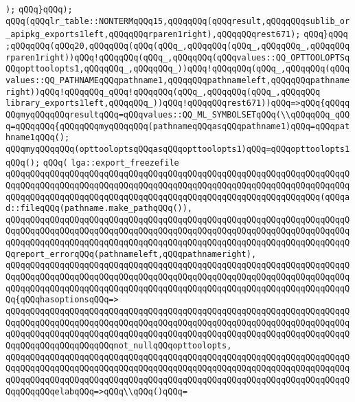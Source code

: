 \verb|);|\newline
\verb|qQQq}qQQq);|\newline
\verb|qQQq(qQQqlr_table::NONTERMqQQq15,qQQqqQQq(qQQqresult,qQQqqQQqsublib_or_apipkg_exports1left,qQQqqQQqrparen1right),qQQqqQQqrest671);|\newline
\verb|qQQq}qQQq|\newline
\verb|;qQQqqQQq(qQQq20,qQQqqQQq(qQQq(qQQq_,qQQqqQQq(qQQq_,qQQqqQQq_,qQQqqQQqrparen1right))qQQq!qQQqqQQq(qQQq_,qQQqqQQq(qQQqvalues::QQ_OPTTOOLOPTSqQQqopttoolopts1,qQQqqQQq_,qQQqqQQq_))qQQq!qQQqqQQq(qQQq_,qQQqqQQq(qQQqvalues::QQ_PATHNAMEqQQqpathname1,qQQqqQQqpathnameleft,qQQqqQQqpathnameright))qQQq!qQQqqQQq_qQQq!qQQqqQQq(qQQq_,qQQqqQQq(qQQq_,qQQqqQQq|\newline
\verb|library_exports1left,qQQqqQQq_))qQQq!qQQqqQQqrest671))qQQq=>qQQq{qQQqqQQqmyqQQqqQQqresultqQQq=qQQqvalues::QQ_ML_SYMBOLSETqQQq(\\qQQqqQQq_qQQq=qQQqqQQq{qQQqqQQqmyqQQqqQQq(pathnameqQQqasqQQqpathname1)qQQq=qQQqpathname1qQQq();|\newline
\verb|qQQqmyqQQqqQQq(opttooloptsqQQqasqQQqopttoolopts1)qQQq=qQQqopttoolopts1qQQq();|\newline
\verb|qQQq(|\newline
\verb|lga::export_freezefile|\newline
\verb|qQQqqQQqqQQqqQQqqQQqqQQqqQQqqQQqqQQqqQQqqQQqqQQqqQQqqQQqqQQqqQQqqQQqqQQqqQQqqQQqqQQqqQQqqQQqqQQqqQQqqQQqqQQqqQQqqQQqqQQqqQQqqQQqqQQqqQQqqQQqqQQqqQQqqQQqqQQqqQQqqQQqqQQqqQQqqQQqqQQqqQQqqQQqqQQqqQQqqQQqqQQq(qQQqad::fileqQQq(pathname.make_pathqQQq()),|\newline
\verb|qQQqqQQqqQQqqQQqqQQqqQQqqQQqqQQqqQQqqQQqqQQqqQQqqQQqqQQqqQQqqQQqqQQqqQQqqQQqqQQqqQQqqQQqqQQqqQQqqQQqqQQqqQQqqQQqqQQqqQQqqQQqqQQqqQQqqQQqqQQqqQQqqQQqqQQqqQQqqQQqqQQqqQQqqQQqqQQqqQQqqQQqqQQqqQQqqQQqqQQqqQQqqQQqqQQqreport_errorqQQq(pathnameleft,qQQqpathnameright),|\newline
\verb|qQQqqQQqqQQqqQQqqQQqqQQqqQQqqQQqqQQqqQQqqQQqqQQqqQQqqQQqqQQqqQQqqQQqqQQqqQQqqQQqqQQqqQQqqQQqqQQqqQQqqQQqqQQqqQQqqQQqqQQqqQQqqQQqqQQqqQQqqQQqqQQqqQQqqQQqqQQqqQQqqQQqqQQqqQQqqQQqqQQqqQQqqQQqqQQqqQQqqQQqqQQqqQQqqQQq{qQQqhasoptionsqQQq=>|\newline
\verb|qQQqqQQqqQQqqQQqqQQqqQQqqQQqqQQqqQQqqQQqqQQqqQQqqQQqqQQqqQQqqQQqqQQqqQQqqQQqqQQqqQQqqQQqqQQqqQQqqQQqqQQqqQQqqQQqqQQqqQQqqQQqqQQqqQQqqQQqqQQqqQQqqQQqqQQqqQQqqQQqqQQqqQQqqQQqqQQqqQQqqQQqqQQqqQQqqQQqqQQqqQQqqQQqqQQqqQQqqQQqqQQqqQQqqQQqnot_nullqQQqopttoolopts,|\newline
\verb|qQQqqQQqqQQqqQQqqQQqqQQqqQQqqQQqqQQqqQQqqQQqqQQqqQQqqQQqqQQqqQQqqQQqqQQqqQQqqQQqqQQqqQQqqQQqqQQqqQQqqQQqqQQqqQQqqQQqqQQqqQQqqQQqqQQqqQQqqQQqqQQqqQQqqQQqqQQqqQQqqQQqqQQqqQQqqQQqqQQqqQQqqQQqqQQqqQQqqQQqqQQqqQQqqQQqqQQqqQQqelabqQQq=>qQQq\\qQQq()qQQq=|\newline
